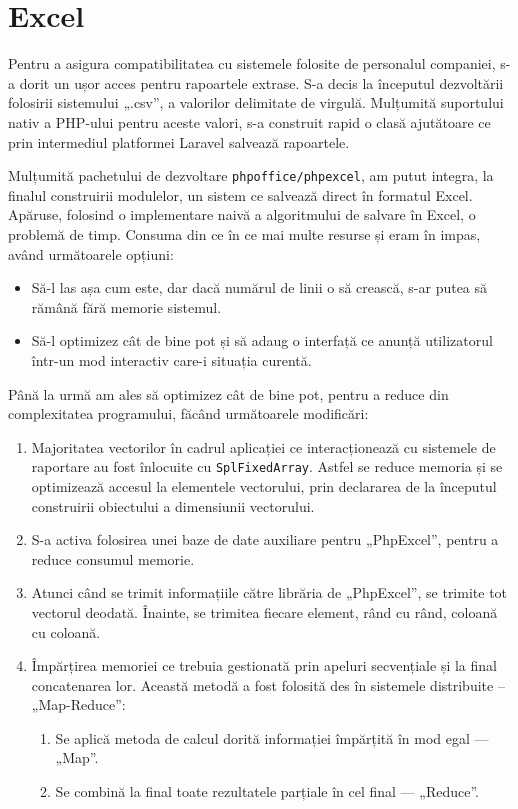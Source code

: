 \section{Excel}

	Pentru a asigura compatibilitatea cu sistemele folosite de personalul companiei, s-a dorit un ușor acces pentru rapoartele extrase.
	S-a decis la începutul dezvoltării folosirii sistemului „.csv”, a valorilor delimitate de virgulă.
	Mulțumită suportului nativ a PHP-ului pentru aceste valori, s-a construit rapid o clasă ajutătoare ce prin intermediul platformei Laravel salvează rapoartele.

	Mulțumită pachetului de dezvoltare \verb|phpoffice/phpexcel|, am putut integra, la finalul construirii modulelor, un sistem ce salvează direct în formatul Excel.
	Apăruse, folosind o implementare naivă a algoritmului de salvare în Excel, o problemă de timp.
	Consuma din ce în ce mai multe resurse și eram în impas, având următoarele opțiuni:
	\begin{itemize}
		\item Să-l las așa cum este, dar dacă numărul de linii o să crească, s-ar putea să rămână fără memorie sistemul.
		\item Să-l optimizez cât de bine pot și să adaug o interfață ce anunță utilizatorul într-un mod interactiv care-i situația curentă.
	\end{itemize}

	Până la urmă am ales să optimizez cât de bine pot, pentru a reduce din complexitatea programului, făcând următoarele modificări:
	\begin{enumerate}
		\item Majoritatea vectorilor în cadrul aplicației ce interacționează cu sistemele de raportare au fost înlocuite cu \verb|SplFixedArray|.
		Astfel se reduce memoria și se optimizează accesul la elementele vectorului, prin declararea de la începutul construirii obiectului a dimensiunii vectorului.
		\item S-a activa folosirea unei baze de date auxiliare pentru „PhpExcel”, pentru a reduce consumul memorie.
		\item Atunci când se trimit informațiile către librăria de „PhpExcel”, se trimite tot vectorul deodată.
		Înainte, se trimitea fiecare element, rând cu rând, coloană cu coloană.
		\item Împărțirea memoriei ce trebuia gestionată prin apeluri secvențiale și la final concatenarea lor.
		Această metodă a fost folosită des în sistemele distribuite -- „Map-Reduce”:
		\begin{enumerate}
			\item Se aplică metoda de calcul dorită informației împărțită în mod egal --- „Map”.
			\item Se combină la final toate rezultatele parțiale în cel final --- „Reduce”.
		\end{enumerate}
	\end{enumerate}

